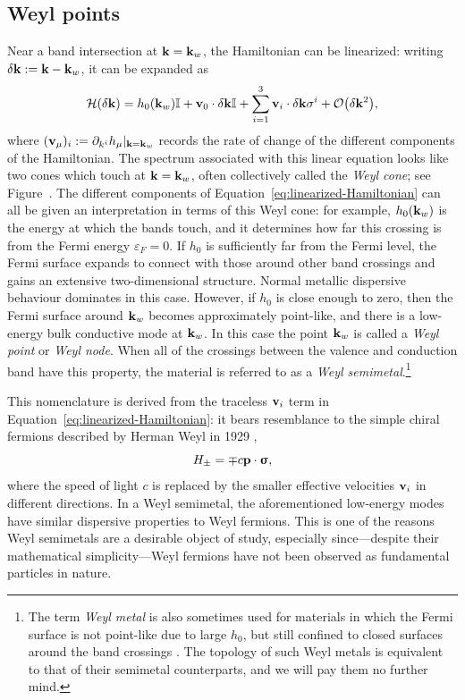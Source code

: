 \subsection{Weyl points}
Near a band intersection at $\vb{k}=\vb{k}_w$, the Hamiltonian can be linearized: writing $\delta\vb{k} := \vb{k} - \vb{k}_w$, it can be expanded as
\begin{equation}\label{eq:linearized-Hamiltonian}
	\Hc(\delta\k) = h_0(\k_w)\Id + \vb{v}_0\cdot\delta\k\Id + \sum_{i=1}^{3}\vb{v}_i\cdot\delta\k \sigma^i + \order{\delta\k^2},
\end{equation} %
where $(\vb{v}_\mu)_i := \partial_{k^i}h_\mu |_{\vb{k}=\vb{k}_w}$ records the rate of change of the different components of the Hamiltonian. The spectrum associated with this linear equation looks like two cones which touch at $\vb{k}=\vb{k}_w$, often collectively called the \emph{Weyl cone}; see Figure~. %
The different components of Equation~\eqref{eq:linearized-Hamiltonian} can all be given an interpretation in terms of this Weyl cone: for example, $h_0(\vb{k}_w)$ is the energy at which the bands touch, and it determines how far this crossing is from the Fermi energy $\varepsilon_F=0$. If $h_0$ is sufficiently far from the Fermi level, the Fermi surface expands to connect with those around other band crossings and gains an extensive two-dimensional structure. Normal metallic dispersive behaviour dominates in this case. However, if $h_0$ is close enough to zero, then the Fermi surface around $\vb{k}_w$ becomes approximately point-like, and there is a low-energy bulk conductive mode at $\vb{k}_w$. In this case the point $\vb{k}_w$ is called a \emph{Weyl point} or \emph{Weyl node}. When all of the crossings between the valence and conduction band have this property, the material is referred to as a \emph{Weyl semimetal}.\footnote{
	The term \emph{Weyl metal} is also sometimes used for materials in which the Fermi surface is not point-like due to large $h_0$, but still confined to closed surfaces around the band crossings \cite{Burkov_Weyl-metals}. The topology of such Weyl metals is equivalent to that of their semimetal counterparts, and we will pay them no further mind.}

This nomenclature is derived from the traceless $\vb{v}_i$ term in Equation~\eqref{eq:linearized-Hamiltonian}: it bears resemblance to the simple chiral fermions described by Herman Weyl in 1929 \cite{Weyl_fermions},
\begin{equation*}
	H_\pm = \mp c\vb{p}\cdot\bm{\upsigma},
\end{equation*}
where the speed of light $c$ is replaced by the smaller effective velocities $\vb{v}_i$ in different directions. In a Weyl semimetal, the aforementioned low-energy modes have similar dispersive properties to Weyl fermions. This is one of the reasons Weyl semimetals are a desirable object of study, especially since---despite their mathematical simplicity---Weyl fermions have not been observed as fundamental particles in nature.

